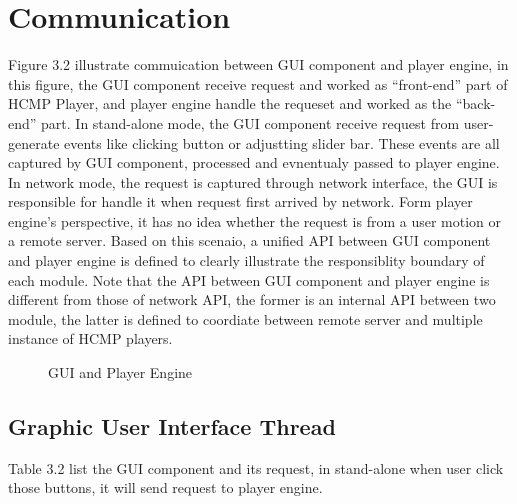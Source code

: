\section{Communication}

Figure 3.2 illustrate commuication between GUI component and player engine, 
in this figure,  
the GUI component receive request and worked as ``front-end'' part of HCMP Player,
and player engine handle the requeset and worked as the ``back-end'' part. 
In stand-alone mode, the GUI component receive request from  
user-generate events like clicking button or adjustting slider bar. These events are
all captured by GUI component, processed and evnentualy passed to player engine. 
In network mode, the request is captured through network interface, the GUI
is responsible for handle it when request first arrived by network.
Form player engine's perspective, it has no 
idea whether the request is from a user motion or a remote server. 
Based on this scenaio, a unified API between GUI component and player engine is 
defined to
clearly illustrate the responsiblity boundary of each module. Note that the 
API between GUI component and player engine is different from those of network API, 
the former is an internal API between two module, the latter is defined to coordiate
between remote server and multiple instance of HCMP players.

\begin{figure}[H]
\caption{GUI and Player Engine}
\label{fig:speciation}
\end{figure}

\subsection{Graphic User Interface Thread}

Table 3.2 list the GUI component and its request, in stand-alone 
when user click those  buttons, it will send request to player engine.

